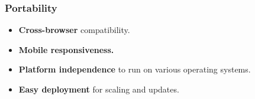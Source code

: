 \subsubsection*{Portability}
\begin{itemize}
    \item \textbf{Cross-browser} compatibility.
    \item \textbf{Mobile responsiveness.}
    \item \textbf{Platform independence} to run on various operating systems.
    \item \textbf{Easy deployment} for scaling and updates.
\end{itemize}


